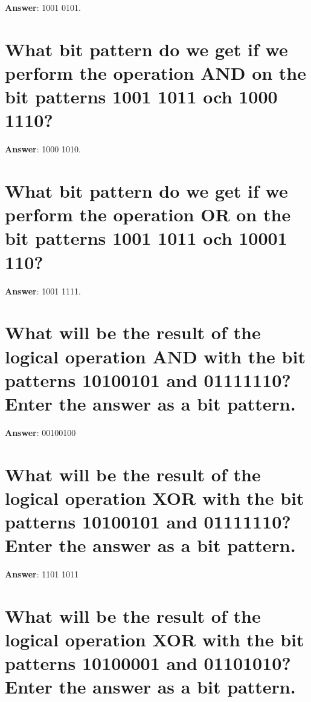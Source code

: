 \documentclass[a4paper,11pt,oneside]{book}
\begin{document}
\begin{sloppypar}
\label{q:406:sa:en:True}

\textbf{Answer}: 1001 0101.



\section{What bit pattern do we get if we perform the operation AND on the bit patterns 1001 1011 och 1000 1110?}

\label{q:407:sa:en:True}

\textbf{Answer}: 1000 1010.



\section{What bit pattern do we get if we perform the operation OR on the bit patterns 1001 1011 och 10001 110?}

\label{q:408:sa:en:True}

\textbf{Answer}: 1001 1111.



\section{What will be the result of the logical operation AND with the bit patterns 10100101 and 01111110? Enter the answer as a bit pattern.}

\label{q:409:sa:en:True}

\textbf{Answer}: 00100100



\section{What will be the result of the logical operation XOR with the bit patterns 10100101 and 01111110? Enter the answer as a bit pattern.}

\label{q:410:sa:en:True}

\textbf{Answer}: 1101 1011



\section{What will be the result of the logical operation XOR with the bit patterns 10100001 and 01101010? Enter the answer as a bit pattern.}

\label{q:411:sa:en:True}


\end{sloppypar}
\end{document}
